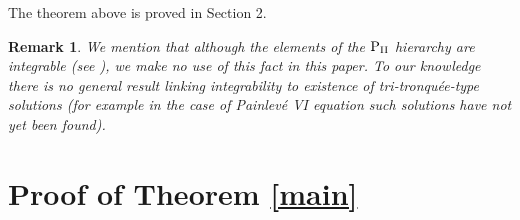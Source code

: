 \documentclass{amsart}
\newtheorem{remark}[theorem]{Remark}
\theoremstyle{definition}
\theoremstyle{remark}
\theoremstyle{remark}
\begin{document}

The theorem above is proved in Section 2.

\begin{remark} We mention that although the elements of the ${\rm P}_{\rm{\scriptstyle II}}$
hierarchy are integrable (see \cite{CJM}), we make no use of this
fact in this paper.
To our knowledge there is no general result linking integrability to
existence of tri-tronqu\'ee-type solutions (for example in the case of
Painlev\'e VI equation such solutions have not yet been found).
\end{remark}


\section{Proof of Theorem \ref{main}}
\end{document}
